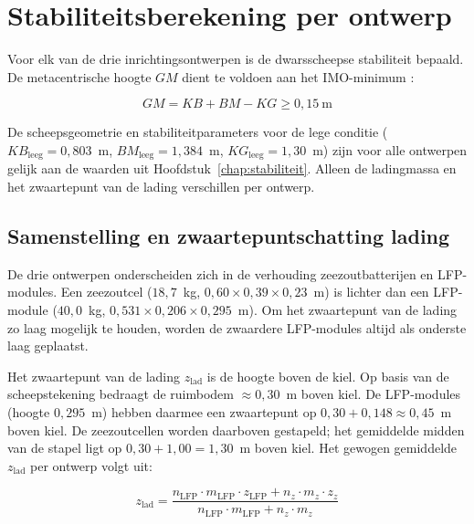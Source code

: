 \section{Stabiliteitsberekening per ontwerp}
\label{sec:stab_ontwerpen}

Voor elk van de drie inrichtingsontwerpen is de dwarsscheepse stabiliteit
bepaald. De metacentrische hoogte $GM$ dient te voldoen aan het IMO-minimum
\cite[p.~44]{Barras2006}:

\begin{equation}
    GM = KB + BM - KG \geq 0{,}15\ \mathrm{m}
    \label{eq:GM_ontwerpen}
\end{equation}

De scheepsgeometrie en stabiliteitparameters voor de lege conditie
($KB_\mathrm{leeg} = 0{,}803$~m, $BM_\mathrm{leeg} = 1{,}384$~m,
$KG_\mathrm{leeg} = 1{,}30$~m) zijn voor alle ontwerpen gelijk aan de
waarden uit Hoofdstuk~\ref{chap:stabiliteit}. Alleen de ladingmassa
en het zwaartepunt van de lading verschillen per ontwerp.

\subsection{Samenstelling en zwaartepuntschatting lading}
\label{sec:stab_samenstelling}

De drie ontwerpen onderscheiden zich in de verhouding zeezoutbatterijen en
LFP-modules. Een zeezoutcel ($18{,}7$~kg, $0{,}60 \times 0{,}39 \times
0{,}23$~m) is lichter dan een LFP-module ($40{,}0$~kg, $0{,}531 \times
0{,}206 \times 0{,}295$~m). Om het zwaartepunt van de lading zo laag
mogelijk te houden, worden de zwaardere LFP-modules altijd als onderste laag
geplaatst.

Het zwaartepunt van de lading $z_\mathrm{lad}$ is de hoogte boven de kiel.
Op basis van de scheepstekening \cite{JansjeTekening2026} bedraagt de
ruimbodem $\approx 0{,}30$~m boven kiel. De LFP-modules (hoogte $0{,}295$~m)
hebben daarmee een zwaartepunt op $0{,}30 + 0{,}148 \approx 0{,}45$~m boven
kiel. De zeezoutcellen worden daarboven gestapeld; het gemiddelde midden van
de stapel ligt op $0{,}30 + 1{,}00 = 1{,}30$~m boven kiel. Het gewogen
gemiddelde $z_\mathrm{lad}$ per ontwerp volgt uit:

\begin{equation}
    z_\mathrm{lad} =
    \frac{n_\mathrm{LFP} \cdot m_\mathrm{LFP} \cdot z_\mathrm{LFP}
        + n_z \cdot m_z \cdot z_z}
         {n_\mathrm{LFP} \cdot m_\mathrm{LFP} + n_z \cdot m_z}
    \label{eq:z_lad}
\end{equation}

